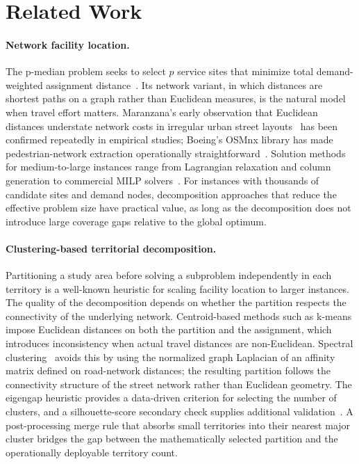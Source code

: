 \section{Related Work}
\label{sec:related}

\paragraph{Network facility location.}
The \mbox{p-median} problem seeks to select $p$ service sites that minimize
total demand-weighted assignment distance~\cite{hakimi1964optimum}.
Its network variant, in which distances are shortest paths on a graph rather
than Euclidean measures, is the natural model when travel effort matters.
Maranzana's early observation that Euclidean distances understate network
costs in irregular urban street layouts~\cite{maranzana1964siting} has been
confirmed repeatedly in empirical studies; Boeing's OSMnx library has made
pedestrian-network extraction operationally straightforward~\cite{boeing2017osmnx}.
Solution methods for medium-to-large instances range from Lagrangian relaxation
and column generation to commercial MILP
solvers~\cite{avella2007lagrangian,lorena2003constructive}.
For instances with thousands of candidate sites and demand nodes,
decomposition approaches that reduce the effective problem size have
practical value, as long as the decomposition does not introduce large
coverage gaps relative to the global optimum.

\paragraph{Clustering-based territorial decomposition.}
Partitioning a study area before solving a subproblem independently in each
territory is a well-known heuristic for scaling facility location to larger
instances.
The quality of the decomposition depends on whether the partition respects
the connectivity of the underlying network.
Centroid-based methods such as \mbox{k-means} impose Euclidean distances on
both the partition and the assignment, which introduces inconsistency when
actual travel distances are non-Euclidean.
Spectral clustering~\cite{shi2000normalized,ng2002spectral,vonluxburg2007tutorial}
avoids this by using the normalized graph Laplacian of an affinity matrix
defined on road-network distances; the resulting partition follows the
connectivity structure of the street network rather than Euclidean geometry.
The eigengap heuristic provides a data-driven criterion for selecting the
number of clusters, and a silhouette-score secondary check supplies additional
validation~\cite{theodoridis2009clustering}.
A post-processing merge rule that absorbs small territories into their nearest
major cluster bridges the gap between the mathematically selected partition
and the operationally deployable territory count.

